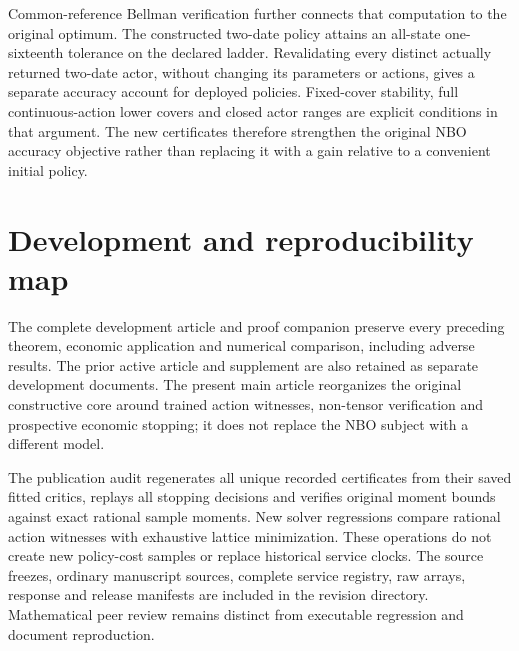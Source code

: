 \documentclass[ecta,nameyear,draft]{econsocart}
\begin{document}
Common-reference Bellman verification further connects that computation to the original optimum. The constructed two-date policy attains an all-state one-sixteenth tolerance on the declared ladder. Revalidating every distinct actually returned two-date actor, without changing its parameters or actions, gives a separate accuracy account for deployed policies. Fixed-cover stability, full continuous-action lower covers and closed actor ranges are explicit conditions in that argument. The new certificates therefore strengthen the original NBO accuracy objective rather than replacing it with a gain relative to a convenient initial policy.

\appendix
\section{Development and reproducibility map}\label{sec:map56}
The complete development article and proof companion preserve every preceding theorem, economic application and numerical comparison, including adverse results. The prior active article and supplement are also retained as separate development documents. The present main article reorganizes the original constructive core around trained action witnesses, non-tensor verification and prospective economic stopping; it does not replace the NBO subject with a different model.

The publication audit regenerates all unique recorded certificates from their saved fitted critics, replays all stopping decisions and verifies original moment bounds against exact rational sample moments. New solver regressions compare rational action witnesses with exhaustive lattice minimization. These operations do not create new policy-cost samples or replace historical service clocks. The source freezes, ordinary manuscript sources, complete service registry, raw arrays, response and release manifests are included in the revision directory. Mathematical peer review remains distinct from executable regression and document reproduction.



\end{document}

